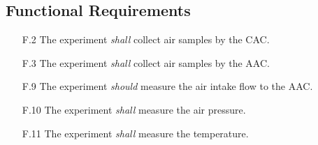 \subsection{Functional Requirements}

\begin{enumerate}
    \item[F.2] The experiment \textit{shall} collect air samples by the CAC.
    \item[F.3] The experiment \textit{shall} collect air samples by the AAC.
    \item[F.9] The experiment \textit{should} measure the air intake flow to the AAC.
    \item[F.10] The experiment \textit{shall} measure the air pressure.
    \item[F.11] The experiment \textit{shall} measure the temperature.
\end{enumerate}